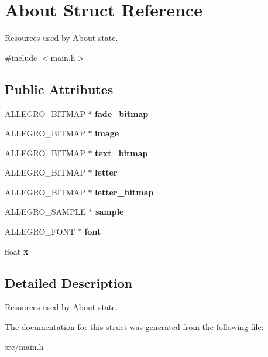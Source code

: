 \hypertarget{structAbout}{\section{\-About \-Struct \-Reference}
\label{structAbout}
}


\-Resources used by \hyperlink{structAbout}{\-About} state.  




{\ttfamily \#include $<$main.\-h$>$}

\subsection*{\-Public \-Attributes}
\begin{DoxyCompactItemize}
\item 
\hypertarget{structAbout_a0c80b08e1d60093504bed342b41e51c1}{\-A\-L\-L\-E\-G\-R\-O\-\_\-\-B\-I\-T\-M\-A\-P $\ast$ {\bfseries fade\-\_\-bitmap}}\label{structAbout_a0c80b08e1d60093504bed342b41e51c1}

\item 
\hypertarget{structAbout_a9e724aa84d322d2bfff5c00109492a1d}{\-A\-L\-L\-E\-G\-R\-O\-\_\-\-B\-I\-T\-M\-A\-P $\ast$ {\bfseries image}}\label{structAbout_a9e724aa84d322d2bfff5c00109492a1d}

\item 
\hypertarget{structAbout_a2e5dbd59393791949fd988de7b770f86}{\-A\-L\-L\-E\-G\-R\-O\-\_\-\-B\-I\-T\-M\-A\-P $\ast$ {\bfseries text\-\_\-bitmap}}\label{structAbout_a2e5dbd59393791949fd988de7b770f86}

\item 
\hypertarget{structAbout_aa46380e60629ac39d782e18dc6a08f8e}{\-A\-L\-L\-E\-G\-R\-O\-\_\-\-B\-I\-T\-M\-A\-P $\ast$ {\bfseries letter}}\label{structAbout_aa46380e60629ac39d782e18dc6a08f8e}

\item 
\hypertarget{structAbout_ab70602512327d638cd7e4a0d711af928}{\-A\-L\-L\-E\-G\-R\-O\-\_\-\-B\-I\-T\-M\-A\-P $\ast$ {\bfseries letter\-\_\-bitmap}}\label{structAbout_ab70602512327d638cd7e4a0d711af928}

\item 
\hypertarget{structAbout_aaae3fb8b349d9973fde2156e1f86c75b}{\-A\-L\-L\-E\-G\-R\-O\-\_\-\-S\-A\-M\-P\-L\-E $\ast$ {\bfseries sample}}\label{structAbout_aaae3fb8b349d9973fde2156e1f86c75b}

\item 
\hypertarget{structAbout_ad14358b4942c0260e502a65b98732f93}{\-A\-L\-L\-E\-G\-R\-O\-\_\-\-F\-O\-N\-T $\ast$ {\bfseries font}}\label{structAbout_ad14358b4942c0260e502a65b98732f93}

\item 
\hypertarget{structAbout_a8ff1ed42ee1abd6ad45def77614015ce}{float {\bfseries x}}\label{structAbout_a8ff1ed42ee1abd6ad45def77614015ce}

\end{DoxyCompactItemize}


\subsection{\-Detailed \-Description}
\-Resources used by \hyperlink{structAbout}{\-About} state. 

\-The documentation for this struct was generated from the following file\-:\begin{DoxyCompactItemize}
\item 
src/\hyperlink{main_8h}{main.\-h}\end{DoxyCompactItemize}
